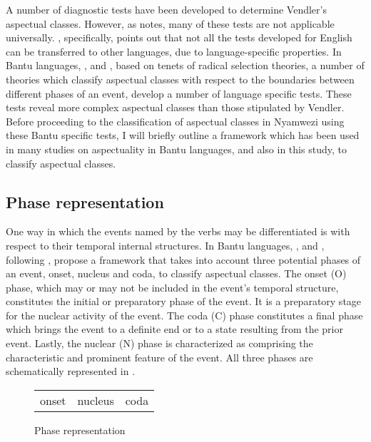 \documentclass[output=paper,newtxmath,modfonts,nonflat,draftmode]{langsci/langscibook}
\begin{document}
A number of diagnostic tests have been developed to determine Vendler’s aspectual classes. However, as \citet[105]{Bar-el2015} notes, many of these tests are not applicable universally. \citet[724]{Filip2012}, specifically, points out that not all the tests developed for English can be transferred to other languages, due to language-specific properties. In Bantu languages, \citet{Kershner2002}, \citet{Botne2008a} and \cite{Persohn2017a,Persohn2017b}, based on tenets of radical selection theories, a number of theories which classify aspectual classes with respect to the boundaries between different phases of an event, develop a number of language specific tests. These tests reveal more complex aspectual classes than those stipulated by Vendler. Before proceeding to the classification of aspectual classes in Nyamwezi using these Bantu specific tests, I will briefly outline a framework which has been used in many studies on aspectuality in Bantu languages, and also in this study, to classify aspectual classes.

\subsection{Phase representation} 

One way in which the events named by the verbs may be differentiated is with respect to their temporal internal structures. In Bantu languages, \citet{Botne1983}, and \citet{Botne2000}, following \citet{Freed1979}, propose a framework that takes into account three potential phases of an event, onset, nucleus and coda, to classify aspectual classes. The onset (O) phase, which may or may not be included in the event’s temporal structure, constitutes the initial or preparatory phase of the event. It is a preparatory stage for the nuclear activity of the event. The coda (C) phase constitutes a final phase which brings the event to a definite end or to a state resulting from the prior event. Lastly, the nuclear (N) phase is characterized as comprising the characteristic and prominent feature of the event. All three phases are schematically represented in .\largerpage[-2]

\begin{figure}
\caption{Phase representation}
\begin{tabularx}{.3\textwidth}{|c|c|c|}
\cline{1-3}
 onset & nucleus & coda\\
\cline{1-3}
\end{tabularx}
\label{fig:kanijo:1}
\end{figure}
\end{document}
